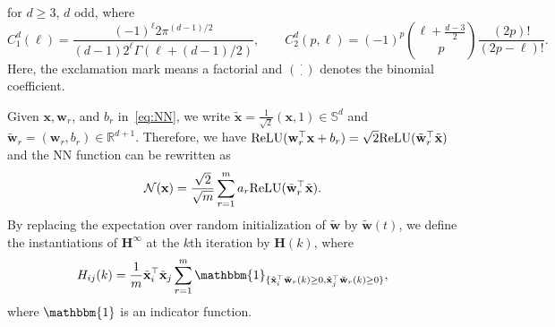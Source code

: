 for $d \geq 3$, $d$ odd, where 
\begin{equation*}
    C^d_1(\ell) = \frac{(-1)^\ell 2\pi^{(d-1)/2}}{(d-1) 2^\ell \Gamma(\ell + (d-1)/2)}, \qquad C^d_2(p,\ell) = (-1)^p {\ell + \frac{d-3}{2} \choose p} \frac{(2p)!}{(2p-\ell)!}.
\end{equation*}
Here, the exclamation mark means a factorial and $\cdot \choose \cdot$ denotes the binomial coefficient. 

Given $\mathbf{x}, \mathbf{w}_r$, and $b_r$ in~\cref{eq:NN}, we write $\tilde{\mathbf{x}} = \frac{1}{\sqrt{2}}(\mathbf{x},1)\in\mathbb{S}^{d}$ and $\tilde{\mathbf{w}}_r = (\mathbf{w}_r,b_r)\in\mathbb{R}^{d+1}$. Therefore, we have ${\rm ReLU}(\mathbf{w}_r^\top \mathbf{x} + b_r) = \sqrt{2}{\rm ReLU}(\tilde{\mathbf{w}}_r^\top \tilde{\mathbf{x}})$ and the NN function can be rewritten as
\begin{equation*}
    {\mathcal{N}}(\mathbf{x}) = \frac{\sqrt{2}}{\sqrt{m}} \sum_{r=1}^m a_r {\rm ReLU}(\tilde{\mathbf{w}}_r^\top \tilde{\mathbf{x}}).
\end{equation*}
By replacing the expectation over random initialization of $\tilde{\mathbf{w}}$ by $\tilde{\mathbf{w}}(t)$, we define the instantiations of ${\mathbf{H}}^\infty$ at the $k$th iteration by ${\mathbf{H}}(k)$, where
\begin{equation}\label{eq:Hk}
    {H}_{ij}(k) = \frac{1}{m} \tilde{\mathbf{x}}_i^\top \tilde{\mathbf{x}}_j \sum_{r=1}^m \mathbbm{1}_{\{\tilde{\mathbf{x}}_i^\top \tilde{\mathbf{w}}_r(k) \geq 0, \tilde{\mathbf{x}}_j^\top \tilde{\mathbf{w}}_r(k) \geq 0\}},
\end{equation}
where $\mathbbm{1}$ is an indicator function. 

